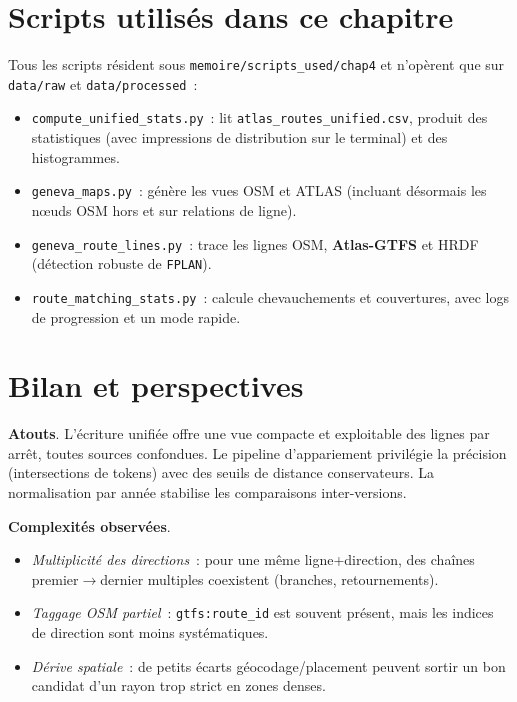 \section{Scripts utilisés dans ce chapitre}
Tous les scripts résident sous \texttt{memoire/scripts\_used/chap4} et n'opèrent que sur \texttt{data/raw} et \texttt{data/processed} :
\begin{itemize}
  \item \texttt{compute\_unified\_stats.py} : lit \texttt{atlas\_routes\_unified.csv}, produit des statistiques (avec impressions de distribution sur le terminal) et des histogrammes.
  \item \texttt{geneva\_maps.py} : génère les vues OSM et ATLAS (incluant désormais les nœuds OSM hors et sur relations de ligne).
  \item \texttt{geneva\_route\_lines.py} : trace les lignes OSM, \textbf{Atlas-GTFS} et HRDF (détection robuste de \texttt{FPLAN}).
  \item \texttt{route\_matching\_stats.py} : calcule chevauchements et couvertures, avec logs de progression et un mode rapide.
\end{itemize}

\section{Bilan et perspectives}
\textbf{Atouts}. L'écriture unifiée offre une vue compacte et exploitable des lignes par arrêt, toutes sources confondues. Le pipeline d'appariement privilégie la précision (intersections de tokens) avec des seuils de distance conservateurs. La normalisation par année stabilise les comparaisons inter-versions.

\textbf{Complexités observées}.
\begin{itemize}
  \item \emph{Multiplicité des directions} : pour une même ligne+direction, des chaînes premier$\rightarrow$dernier multiples coexistent (branches, retournements).
  \item \emph{Taggage OSM partiel} : \texttt{gtfs:route\_id} est souvent présent, mais les indices de direction sont moins systématiques.
  \item \emph{Dérive spatiale} : de petits écarts géocodage/placement peuvent sortir un bon candidat d'un rayon trop strict en zones denses.
\end{itemize}

